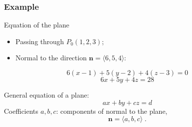 \begin{frame}
\begin{columns}
  \column{6cm}
\end{columns}
\end{frame}

\begin{frame}
 \frametitle{Example}

Equation of the plane
\begin{itemize}
 \item Passing through $P_0(1,2,3)$;
\item Normal to the direction $\textbf{n} = \langle 6,5,4\rangle$:
\end{itemize}
%
\pause
$$6(x-1) + 5(y-2) + 4(z-3) = 0$$
%
$$6x +5y+4z = 28$$

\pause General equation of a plane:
%
$$ax+by+cz = d$$
%
Coefficients $a,b,c$: \pause components of normal to the plane,
%
$$\textbf{n} = \langle a,b,c\rangle\; .$$

\end{frame}

